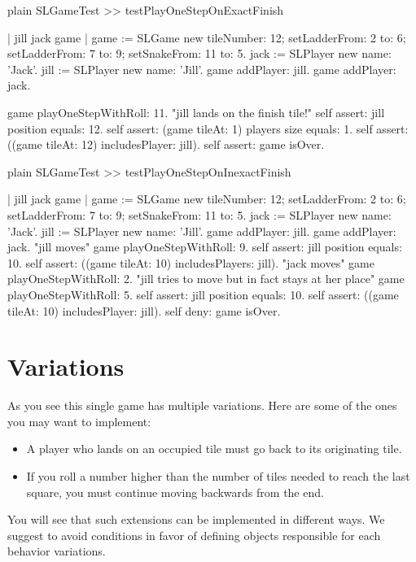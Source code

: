 \documentclass[10pt,twoside,english]{_support/latex/sbabook/sbabook}
\begin{document}
\begin{displaycode}{plain}
SLGameTest >> testPlayOneStepOnExactFinish
	
	| jill jack game |
	game := SLGame new 
			tileNumber: 12; 
			setLadderFrom: 2 to: 6;
			setLadderFrom: 7 to: 9;
			setSnakeFrom: 11 to: 5.
	jack := SLPlayer new name: 'Jack'.
	jill := SLPlayer new name: 'Jill'.
	game addPlayer: jill. 
	game addPlayer: jack. 

	game playOneStepWithRoll: 11.
	"jill lands on the finish tile!"
	self assert: jill position equals: 12.
	self assert: (game tileAt: 1) players size equals: 1. 
	self assert: ((game tileAt: 12) includesPlayer: jill).
	self assert: game isOver.
\end{displaycode}

\begin{displaycode}{plain}
SLGameTest >> testPlayOneStepOnInexactFinish
	
	| jill jack game |
	game := SLGame new 
			tileNumber: 12; 
			setLadderFrom: 2 to: 6;
			setLadderFrom: 7 to: 9;
			setSnakeFrom: 11 to: 5.
	jack := SLPlayer new name: 'Jack'.
	jill := SLPlayer new name: 'Jill'.
	game addPlayer: jill. 
	game addPlayer: jack. 
    "jill moves"
	game playOneStepWithRoll: 9.
	self assert: jill position equals: 10.
	self assert: ((game tileAt: 10) includesPlayers: jill).
	"jack moves"
	game playOneStepWithRoll: 2. 
	"jill tries to move but in fact stays at her place"
	game playOneStepWithRoll: 5.
	self assert: jill position equals: 10.
	self assert: ((game tileAt: 10) includesPlayer: jill).
	self deny: game isOver.
\end{displaycode}
\section{Variations}
As you see this single game has multiple variations. Here are some of the ones you may want to implement:

\begin{itemize}
\item A player who lands on an occupied tile must go back to its originating tile.
\item If you roll a number higher than the number of tiles needed to reach the last square, you must continue moving backwards from the end. 
\end{itemize}

You will see that such extensions can be implemented in different ways. We suggest to avoid conditions in favor of defining objects responsible for each behavior variations.
\end{document}
